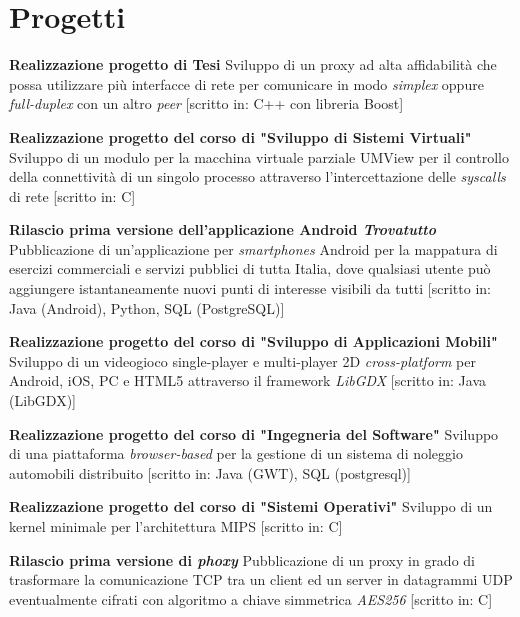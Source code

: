 \documentclass[11pt,a4paper,sans]{moderncv} %
\begin{document}
\section{Progetti}
 {\textbf{Realizzazione progetto di Tesi} \newline Sviluppo di un proxy ad alta affidabilità che possa utilizzare più interfacce di rete per comunicare in modo {\em simplex} oppure {\em full-duplex} con un altro {\em peer} [scritto in: C++ con libreria Boost]}

 {\textbf{Realizzazione progetto del corso di "Sviluppo di Sistemi Virtuali"} \newline Sviluppo di un modulo per la macchina virtuale parziale UMView per il controllo della connettività di un singolo processo attraverso l'intercettazione delle {\em syscalls} di rete [scritto in: C]}

 {\textbf{Rilascio prima versione dell'applicazione Android {\em Trovatutto}} \newline Pubblicazione di un'applicazione per {\em smartphones} Android per la mappatura di esercizi commerciali e servizi pubblici di tutta Italia, dove qualsiasi utente può aggiungere istantaneamente nuovi punti di interesse visibili da tutti [scritto in: Java (Android), Python, SQL (PostgreSQL)]}

 {\textbf{Realizzazione progetto del corso di "Sviluppo di Applicazioni Mobili"} \newline Sviluppo di un videogioco single-player e multi-player 2D {\em cross-platform} per Android, iOS, PC e HTML5 attraverso il framework {\em LibGDX} [scritto in: Java (LibGDX)]}

 {\textbf{Realizzazione progetto del corso di "Ingegneria del Software"} \newline Sviluppo di una piattaforma {\em browser-based} per la gestione di un sistema di noleggio automobili distribuito [scritto in: Java (GWT), SQL (postgresql)]}

 {\textbf{Realizzazione progetto del corso di "Sistemi Operativi"} \newline Sviluppo di un kernel minimale per l'architettura MIPS [scritto in: C]}

 {\textbf{Rilascio prima versione di {\em phoxy}} \newline Pubblicazione di un proxy in grado di trasformare la comunicazione TCP tra un client ed un server in datagrammi UDP eventualmente cifrati con algoritmo a chiave simmetrica {\em AES256} [scritto in: C]}
\end{document}
